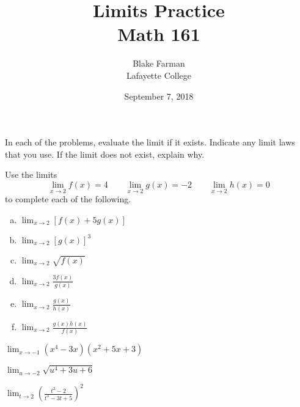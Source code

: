 \documentclass[10pt]{amsart}
\title[Limits]{Limits Practice\\Math 161}
\date{September 7, 2018}
\author{Blake Farman\\Lafayette College}
\begin{document}
\maketitle

\makenameslot

In each of the problems, evaluate the limit if it exists.  
Indicate any limit laws that you use.
If the limit does not exist, explain why.
\begin{thm}
  Use the limits
  \[\lim_{x \to 2} f(x) = 4 \qquad \lim_{x\to 2} g(x) = -2\qquad \lim_{x\to2} h(x) = 0\]
  to complete each of the following.

  \begin{enumerate}[(a)]
  \item
    \(\displaystyle{\lim_{x \to 2} [f(x) + 5g(x)]}\)
    \vspace{1in}
  \item
    \(\displaystyle{\lim_{x \to 2} \left[g(x)\right]^3}\)
    \vspace{1in}
  \item
    \(\displaystyle{\lim_{x \to 2} \sqrt{f(x)}}\)
    \vspace{1in}
  \item
    \(\displaystyle{\lim_{x \to 2} \frac{3f(x)}{g(x)}}\)
    \vspace{1in}
  \item
    \(\displaystyle{\lim_{x \to 2} \frac{g(x)}{h(x)}}\)
    \vspace{1in}
  \item
    \(\displaystyle{\lim_{x \to 2} \frac{g(x)h(x)}{f(x)}}\)
    \vspace{1in}

  \end{enumerate}
\end{thm}

\begin{thm}
  \(\displaystyle{\lim_{x \to -1}(x^4 - 3x)(x^2 + 5x + 3)}\)
\end{thm}

\vspace{1in}

\begin{thm}
  \(\displaystyle{\lim_{u \to -2} \sqrt{u^4 + 3u + 6}}\)
\end{thm}

\vspace{1in}

\begin{thm}
  \(\displaystyle{\lim_{t \to 2} \left(\frac{t^2 - 2}{t^3 - 3t + 5}\right)^2}\)
\end{thm}
\end{document}
